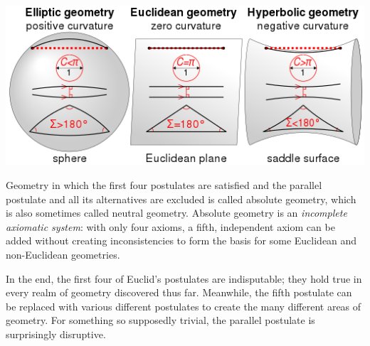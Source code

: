 \documentclass{article}
\begin{document}
\begin{center}
    \includegraphics[scale = 0.3]{images/parallel3.png}
\end{center}

Geometry in which the first four postulates are satisfied and the parallel postulate and all its alternatives are excluded is called absolute geometry, which is also sometimes called neutral geometry. Absolute geometry is an \textit{incomplete axiomatic system}: with only four axioms, a fifth, independent axiom can be added without creating inconsistencies to form the basis for some Euclidean and non-Euclidean geometries. 

In the end, the first four of Euclid’s postulates are indisputable; they hold true in every realm of geometry discovered thus far. Meanwhile, the fifth postulate can be replaced with various different postulates to create the many different areas of geometry. For something so supposedly trivial, the parallel postulate is surprisingly disruptive.
\end{document}
